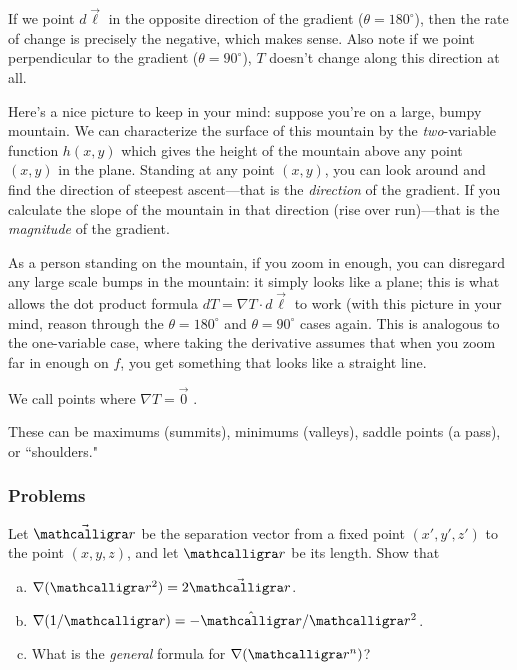 If we point $d\vec{\ell}$ in the opposite direction of the gradient ($\theta=180^\circ$), then the rate of change is precisely the negative, which makes sense. Also note if we point perpendicular to the gradient ($\theta=90^\circ$), $T$ doesn't change along this direction at all.

Here's a nice picture to keep in your mind: suppose you're on a large, bumpy mountain. We can characterize the surface of this mountain by the \textit{two}-variable function $h(x,y)$ which gives the height of the mountain above any point $(x,y)$ in the plane. Standing at any point $(x,y)$, you can look around and find the direction of steepest ascent---that is the \textit{direction} of the gradient. If you calculate the slope of the mountain in that direction (rise over run)---that is the \textit{magnitude} of the gradient. 

As a person standing on the mountain, if you zoom in enough, you can disregard any large scale bumps in the mountain: it simply looks like a plane; this is what allows the dot product formula $dT=\nabla T\cdot d\vec{\ell}$ to work (with this picture in your mind, reason through the $\theta=180^\circ$ and $\theta=90^\circ$ cases again. This is analogous to the one-variable case, where taking the derivative assumes that when you zoom far in enough on $f$, you get something that looks like a straight line. 

\begin{definition}
We call points where $\nabla T=\vec{0}$ .
\end{definition}

These can be maximums (summits), minimums (valleys), saddle points (a pass), or ``shoulders."

\subsubsection*{Problems}

 Let $\vec{\scripty{r}}$ be the separation vector from a fixed point $(x',y',z')$ to the point $(x,y,z)$, and let $\scripty{r}$ be its length. Show that
\begin{enumerate}[(a)]
    \item $\nabla(\scr^2)=2\vec{\scr}$.
    \item $\nabla(1/\scr)=-\hat{\scr}/\scr^2$.
    \item What is the \textit{general} formula for $\nabla(\scr^n)$?
\end{enumerate}

